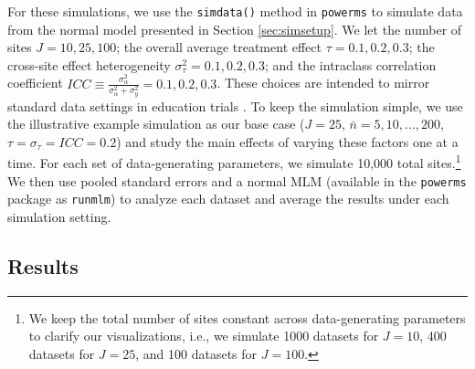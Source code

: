 \documentclass[]{article}
\begin{document}
For these simulations, we use the \texttt{sim\textunderscore data()} method in \texttt{powerms} to simulate data from the normal model presented in Section \ref{sec:simsetup}.
We let the number of sites $J = 10, 25, 100$; the overall average treatment effect $\tau = 0.1, 0.2, 0.3$; the cross-site effect heterogeneity $\sigma^2_\tau = 0.1, 0.2, 0.3$; and the intraclass correlation coefficient $ICC \equiv \frac{\sigma^2_\alpha}{\sigma^2_\alpha + \sigma^2_y} = 0.1, 0.2, 0.3$.
These choices are intended to mirror standard data settings in education trials \citep{weiss2017much}.
To keep the simulation simple, we use the illustrative example simulation as our base case ($J=25$, $\bar{n}=5,10,\dots,200$, $\tau=\sigma_\tau=ICC=0.2$) and study the main effects of varying these factors one at a time.
For each set of data-generating parameters, we simulate 10,000 total sites.\footnote{We keep the total number of sites constant across data-generating parameters to clarify our visualizations, i.e., we simulate 1000 datasets for $J=10$, 400 datasets for $J=25$, and 100 datasets for $J=100$.}
We then use pooled standard errors and a normal MLM (available in the \texttt{powerms} package as \texttt{run\textunderscore mlm}) to analyze each dataset and average the results under each simulation setting.

\subsection{Results}
\end{document}
